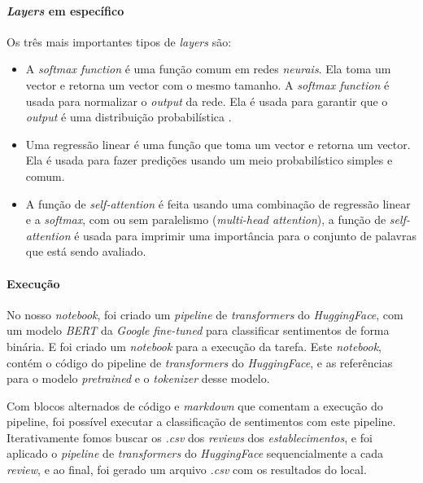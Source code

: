 \paragraph{\textit{Layers} em específico\\}

Os três mais importantes tipos de \textit{layers} \cite{hf1} são:
\begin{itemize}
  \setlength\itemsep{0.05em}
    \item A \textit{softmax function} é uma função comum em redes \textit{neurais}. Ela toma um vector e retorna um vector com o mesmo tamanho. A \textit{softmax function} é usada para normalizar o \textit{output} da rede. Ela é usada para garantir que o \textit{output} é uma distribuição probabilística \cite{mtf1}.
    \item Uma regressão linear é uma função que toma um vector e retorna um vector. Ela é usada para fazer predições usando um meio probabilístico simples e comum.
    \item A função de \textit{self-attention} é feita usando uma combinação de regressão linear e a \textit{softmax}, com ou sem paralelismo (\textit{multi-head attention}), a função de \textit{self-attention} é usada para imprimir uma importância para o conjunto de palavras que está sendo avaliado.
\end{itemize}

\paragraph{Execução\\}

No nosso \textit{notebook}, foi criado um \textit{pipeline} de \textit{transformers} do \textit{HuggingFace}, com um modelo \textit{BERT} da \textit{Google} \textit{fine-tuned}\cite{hf1} para classificar sentimentos de forma binária. E foi criado um \textit{notebook} para a execução da tarefa. Este \textit{notebook}, contém o código do pipeline de \textit{transformers} do \textit{HuggingFace}, e as referências para o modelo \textit{pretrained} e o \textit{tokenizer} desse modelo.

Com blocos alternados de código e \textit{markdown} que comentam a execução do pipeline, foi possível executar a classificação de sentimentos com este pipeline. Iterativamente fomos buscar os \textit{.csv} dos \textit{reviews} dos \textit{establecimentos}, e foi aplicado o \textit{pipeline} de \textit{transformers} do \textit{HuggingFace} sequencialmente a cada \textit{review}, e ao final, foi gerado um arquivo \textit{.csv} com os resultados do local.

